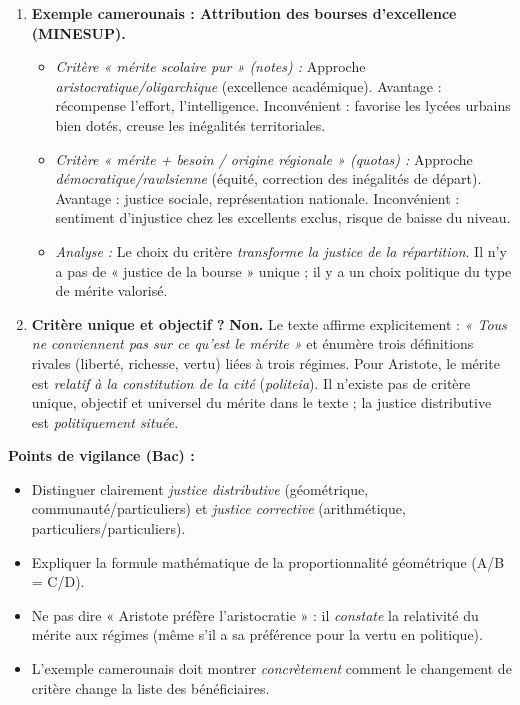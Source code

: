 \documentclass[11pt]{article}
\begin{document}
\begin{corrige}
\begin{enumerate}
\begin{itemize}
      \end{itemize}
\item \textbf{Exemple camerounais : Attribution des bourses d'excellence (MINESUP).}
      \begin{itemize}
      \item \emph{Critère « mérite scolaire pur » (notes) :} Approche \emph{aristocratique/oligarchique} (excellence académique). Avantage : récompense l'effort, l'intelligence. Inconvénient : favorise les lycées urbains bien dotés, creuse les inégalités territoriales.
      \item \emph{Critère « mérite + besoin / origine régionale » (quotas) :} Approche \emph{démocratique/rawlsienne} (équité, correction des inégalités de départ). Avantage : justice sociale, représentation nationale. Inconvénient : sentiment d'injustice chez les excellents exclus, risque de baisse du niveau.
      \item \emph{Analyse :} Le choix du critère \emph{transforme la justice de la répartition}. Il n'y a pas de « justice de la bourse » unique ; il y a un choix politique du type de mérite valorisé.
      \end{itemize}
\item \textbf{Critère unique et objectif ?} \textbf{Non.} Le texte affirme explicitement : \emph{« Tous ne conviennent pas sur ce qu'est le mérite »} et énumère trois définitions rivales (liberté, richesse, vertu) liées à trois régimes. Pour Aristote, le mérite est \emph{relatif à la constitution de la cité} (\emph{politeia}). Il n'existe pas de critère unique, objectif et universel du mérite dans le texte ; la justice distributive est \emph{politiquement située}.
\end{enumerate}

\textbf{Points de vigilance (Bac) :}
\begin{itemize}
\item Distinguer clairement \emph{justice distributive} (géométrique, communauté/particuliers) et \emph{justice corrective} (arithmétique, particuliers/particuliers).
\item Expliquer la formule mathématique de la proportionnalité géométrique (A/B = C/D).
\item Ne pas dire « Aristote préfère l'aristocratie » : il \emph{constate} la relativité du mérite aux régimes (même s'il a sa préférence pour la vertu en politique).
\item L'exemple camerounais doit montrer \emph{concrètement} comment le changement de critère change la liste des bénéficiaires.
\end{itemize}
\end{corrige}
\end{document}
